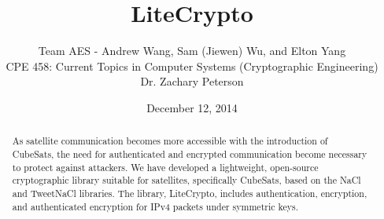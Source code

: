 \documentclass[12pt]{article}
\begin{document}
\title{\vfill LiteCrypto} %
\author{
Team AES - Andrew Wang, Sam (Jiewen) Wu, and Elton Yang \vspace{10pt} \\
CPE 458: Current Topics in Computer Systems (Cryptographic Engineering)  \vspace{10pt} \\
Dr. Zachary Peterson \vspace{10pt} \\
}
\date{December 12, 2014} %

\maketitle

\vfill  %
\begin{abstract}
As satellite communication becomes more accessible with the introduction of CubeSats, the need for authenticated and encrypted communication become necessary to protect against attackers. We have developed a lightweight, open-source cryptographic library suitable for satellites, specifically CubeSats, based on the NaCl and TweetNaCl libraries. The library, LiteCrypto, includes authentication, encryption, and authenticated encryption for IPv4 packets under symmetric keys.

\end{abstract}
\thispagestyle{empty} %
\newpage
\thispagestyle{empty}
\tableofcontents
\thispagestyle{empty}
\mbox{}
\newpage
\end{document}
